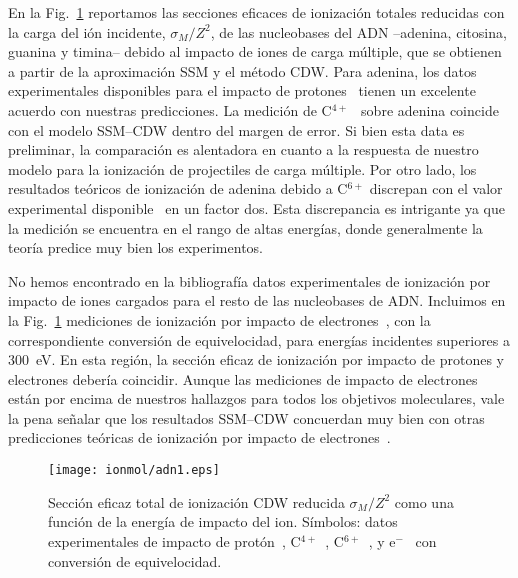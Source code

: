 En la Fig.~\ref{fig:crossDNA_1} reportamos las secciones eficaces de 
ionización totales reducidas con la carga del ión incidente, 
$\sigma_M/Z^2$, de las nucleobases del ADN --adenina, citosina, guanina y 
timina-- debido al impacto de iones de carga múltiple, que se obtienen a 
partir de la aproximación SSM y el método CDW. Para adenina, los datos 
experimentales disponibles para el impacto de protones~\cite{Iriki:11} 
tienen un excelente acuerdo con nuestras 
predicciones. La medición de C$^{4+}$~\cite{Sens:20} sobre adenina 
coincide con el modelo SSM--CDW dentro del margen de error. Si bien esta
data es preliminar, la comparación es alentadora en cuanto a la respuesta 
de nuestro modelo para la ionización de projectiles de carga múltiple. 
Por otro lado, los resultados teóricos de ionización de adenina debido a 
C$^{6+}$ discrepan con el valor experimental 
disponible~\cite{Bhattacharjee:19} en un factor dos. Esta discrepancia es 
intrigante ya que la medición se encuentra en el rango de altas energías, 
donde generalmente la teoría predice muy bien los experimentos.

No hemos encontrado en la bibliografía datos experimentales de ionización 
por impacto de iones cargados para el resto de las nucleobases de ADN.
Incluimos en la Fig.~\ref{fig:crossDNA_1} mediciones de ionización por 
impacto de electrones~\cite{Rahman:16}, con la correspondiente 
conversión de equivelocidad, para energías incidentes superiores a 
300~eV. En esta región, la sección eficaz de ionización por impacto de 
protones y electrones debería coincidir. Aunque las mediciones de impacto 
de electrones están por encima de nuestros hallazgos para todos los 
objetivos moleculares, vale la pena señalar que los resultados SSM--CDW
concuerdan muy bien con otras predicciones teóricas de ionización por 
impacto de electrones~\cite{mozejko2003,tan2018}.

\begin{figure}
\centering
\texttt{[image: ionmol/adn1.eps]}
\caption[Sección eficaz total de ionización reducida por $Z$ (Parte I).]
{Sección eficaz total de ionización CDW reducida $\sigma_{M}/Z^2$ como 
una función de la energía de impacto del ion. Símbolos: datos 
experimentales de impacto de protón~\cite{Iriki:11}, 
C$^{4+}$~\cite{Sens:20}, C$^{6+}$~\cite{Bhattacharjee:19}, y 
e$^-$~\cite{Rahman:16} con conversión de equivelocidad.}
\label{fig:crossDNA_1}
\end{figure} 

